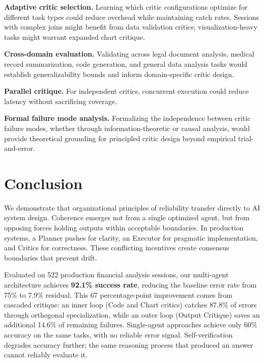 \documentclass[sigconf]{acmart}
\begin{document}
\textbf{Adaptive critic selection.} Learning which critic configurations optimize for different task types could reduce overhead while maintaining catch rates. Sessions with complex joins might benefit from data validation critics; visualization-heavy tasks might warrant expanded chart critique.

\textbf{Cross-domain evaluation.} Validating across legal document analysis, medical record summarization, code generation, and general data analysis tasks would establish generalizability bounds and inform domain-specific critic design.

\textbf{Parallel critique.} For independent critics, concurrent execution could reduce latency without sacrificing coverage.

\textbf{Formal failure mode analysis.} Formalizing the independence between critic failure modes, whether through information-theoretic or causal analysis, would provide theoretical grounding for principled critic design beyond empirical trial-and-error.

\section{Conclusion}
\label{sec:conclusion}

We demonstrate that organizational principles of reliability transfer directly to AI system design. Coherence emerges not from a single optimized agent, but from opposing forces holding outputs within acceptable boundaries. In production systems, a Planner pushes for clarity, an Executor for pragmatic implementation, and Critics for correctness. These conflicting incentives create consensus boundaries that prevent drift.

Evaluated on 522 production financial analysis sessions, our multi-agent architecture achieves \textbf{92.1\% success rate}, reducing the baseline error rate from 75\% to 7.9\% residual. This 67 percentage-point improvement comes from cascaded critique: an inner loop (Code and Chart critics) catches 87.8\% of errors through orthogonal specialization, while an outer loop (Output Critique) saves an additional 14.6\% of remaining failures. Single-agent approaches achieve only 60\% accuracy on the same tasks, with no reliable error signal. Self-verification degrades accuracy further; the same reasoning process that produced an answer cannot reliably evaluate it.
\end{document}
